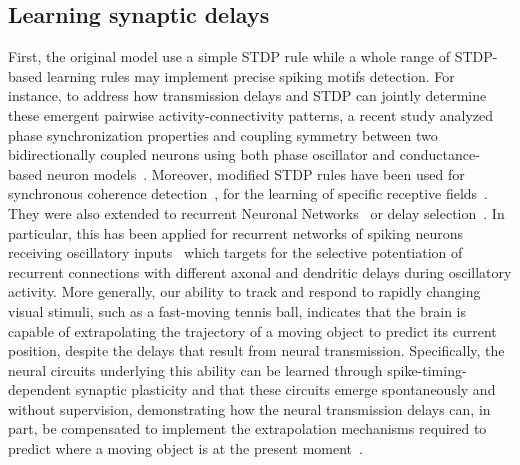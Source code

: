\documentclass[brainsci, %
               review,submit,pdftex,moreauthors
               ]{Definitions/mdpi}
\begin{document}
\subsection{Learning synaptic delays}
First, the original model use a simple STDP rule while a whole range of STDP-based learning rules may implement precise spiking motifs detection. For instance, to address how transmission delays and STDP can jointly determine these emergent pairwise activity-connectivity patterns, a recent study analyzed phase synchronization properties and coupling symmetry between two bidirectionally coupled neurons using both phase oscillator and conductance-based neuron models~\citep{madadi_asl_delay-dependent_2022}. Moreover, modified STDP rules have been used for synchronous coherence detection~\citep{perrinet_coherence_2002}, for the learning of specific receptive fields~\citep{perrinet_networks_2001}. They were also extended to recurrent Neuronal Networks~\citep{gilson_stdp_2010} or delay selection~\citep{datadien_right_2011}. In particular, this has been applied for recurrent networks of spiking neurons receiving oscillatory inputs~\citep{kerr_delay_2013} which targets for the selective potentiation of recurrent connections with different axonal and dendritic delays during oscillatory activity. More generally, our ability to track and respond to rapidly changing visual stimuli, such as a fast-moving tennis ball, indicates that the brain is capable of extrapolating the trajectory of a moving object to predict its current position, despite the delays that result from neural transmission. Specifically, the neural circuits underlying this ability can be learned through spike-timing-dependent synaptic plasticity and that these circuits emerge spontaneously and without supervision, demonstrating how the neural transmission delays can, in part, be compensated to implement the extrapolation mechanisms required to predict where a moving object is at the present moment~\citep{burkitt_predictive_2021}.
\end{document}
